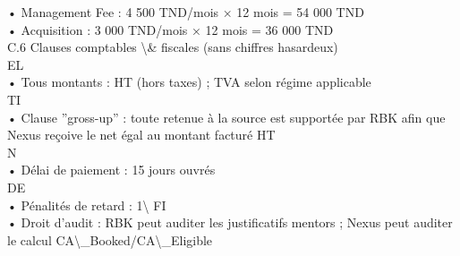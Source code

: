 • Management Fee : 4 500 TND/mois × 12 mois = 54 000 TND\\
\vspace{0.5em}
• Acquisition : 3 000 TND/mois × 12 mois = 36 000 TND\\
\vspace{0.5em}
\vspace{0.5em}
\vspace{0.5em}
C.6 Clauses comptables \textbackslash{}& fiscales (sans chiffres hasardeux)\\
\vspace{0.5em}
\vspace{0.5em}
\vspace{0.5em}
\vspace{0.5em}
EL\\
• Tous montants : HT (hors taxes) ; TVA selon régime applicable\\
\vspace{0.5em}
\vspace{0.5em}
\vspace{0.5em}
\vspace{0.5em}
TI\\
• Clause ”gross-up” : toute retenue à la source est supportée par RBK afin que Nexus reçoive le net égal au montant facturé HT\\
\vspace{0.5em}
\vspace{0.5em}
\vspace{0.5em}
\vspace{0.5em}
N\\
• Délai de paiement : 15 jours ouvrés\\
\vspace{0.5em}
\vspace{0.5em}
\vspace{0.5em}
\vspace{0.5em}
DE\\
• Pénalités de retard : 1\textbackslash{}%
\vspace{0.5em}
\vspace{0.5em}
\vspace{0.5em}
\vspace{0.5em}
FI\\
• Droit d’audit : RBK peut auditer les justificatifs mentors ; Nexus peut auditer le calcul CA\textbackslash{}_Booked/CA\textbackslash{}_Eligible\\
\vspace{0.5em}
